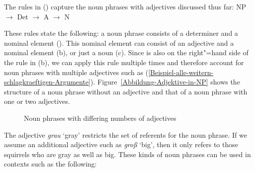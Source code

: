 %
The rules in () capture the noun phrases with adjectives discussed thus far:
\eal
\label{NP-Regeln}
\ex NP $\to$ Det \nbar
\ex\label{NP-Regeln-Adj} \nbar $\to$ A \nbar
\ex\label{NP-Regeln-Nbar-N} \nbar $\to$ N
\zl

\largerpage
\noindent
These rules state the following: a noun phrase consists of a determiner and a nominal element (\nbar). This nominal element
can consist of an adjective and a nominal element (b), or just a noun (c). Since \nbar is also on the right"=hand side
of the rule in (b), we can apply this rule multiple times and therefore account for noun phrases with multiple adjectives such as
(\ref{Beispiel-alle-weitern-schlagkraeftigen-Argumente}). Figure~\vref{Abbildung-Adjektive-in-NP} shows the structure of a noun phrase
without an adjective and that of a noun phrase with one or two adjectives.
\begin{figure}
\scalebox{.9}{%
\begin{forest}
sm edges
[NP
   [Det [ein;a] ]
   [\nbar
      [N [Eichhörnchen;squirrel] ] ] ]
\end{forest}}
\hfill
\scalebox{.9}{%
\begin{forest}
sm edges
[NP
   [Det [ein;a] ]
   [\nbar
      [A [graues;gray] ]
      [\nbar
        [N [Eichhörnchen;squirrel] ] ] ] ]
\end{forest}}
%
\hfill
\scalebox{.9}{%
\begin{forest}
sm edges
[NP
  [Det [ein;a] ]
    [\nbar
    [A [großes;big] ]
       [\nbar
       [A [graues;gray] ]
         [\nbar
         [N [Eichhörnchen;squirrel] ] ] ] ] ]
\end{forest}}
%
\caption{\label{Abbildung-Adjektive-in-NP}Noun phrases with differing numbers of adjectives}
\end{figure}%
The adjective \emph{grau} `gray' restricts the set of referents for the noun phrase. If we assume an
additional adjective such as \emph{groß} `big', then it only refers to those squirrels who are gray
as well as big. These kinds of noun phrases can be used in contexts such as the following:

